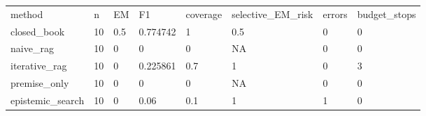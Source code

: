 \begin{tabular}{llllllll}
\hline
method & n & EM & F1 & coverage & selective\_EM\_risk & errors & budget\_stops \\
closed\_book & 10 & 0.5 & 0.774742 & 1 & 0.5 & 0 & 0 \\
naive\_rag & 10 & 0 & 0 & 0 & NA & 0 & 0 \\
iterative\_rag & 10 & 0 & 0.225861 & 0.7 & 1 & 0 & 3 \\
premise\_only & 10 & 0 & 0 & 0 & NA & 0 & 0 \\
epistemic\_search & 10 & 0 & 0.06 & 0.1 & 1 & 1 & 0 \\
\hline
\end{tabular}
